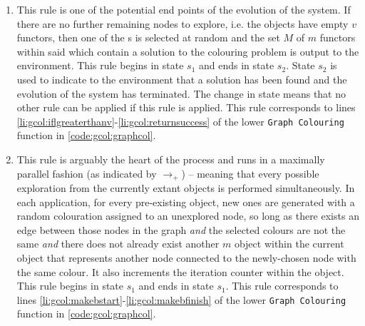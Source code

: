 \begin{enumerate}
\item This rule is one of the potential end points of the evolution of the system.  If there are no further remaining nodes to explore, i.e. the \bo{} objects have empty \(v\) functors, then one of the \bo{}s is selected at random and the set \(M\) of \(m\) functors within said \bo{} which contain a solution to the colouring problem is output to the environment.  This rule begins in state \(s_1\) and ends in state \(s_2\).  State \(s_2\) is used to indicate to the environment that a solution has been found and the evolution of the system has terminated.  The change in state means that no other rule can be applied if this rule is applied.  This rule corresponds to lines \ref{li:gcol:iflgreaterthanv}-\ref{li:gcol:returnsuccess} of the lower \texttt{Graph Colouring} function in \autoref{code:gcol:graphcol}.


\item This rule is arguably the heart of the process and runs in a maximally parallel fashion (as indicated by \(\rightarrow_+\)) -- meaning that every possible exploration from the currently extant \bo{} objects is performed simultaneously.  In each application, for every pre-existing \bo{} object, new ones are generated with a random colouration assigned to an unexplored node, so long as there exists an edge between those nodes in the graph \emph{and} the selected colours are not the same \emph{and} there does not already exist another \(m\) object within the current \bo{} object that represents another node connected to the newly-chosen node with the same colour.  It also increments the iteration counter within the \bo{} object.  This rule begins in state \(s_1\) and ends in state \(s_1\).  This rule corresponds to lines \ref{li:gcol:makebstart}-\ref{li:gcol:makebfinish} of the lower \texttt{Graph Colouring} function in \autoref{code:gcol:graphcol}.


\end{enumerate}

